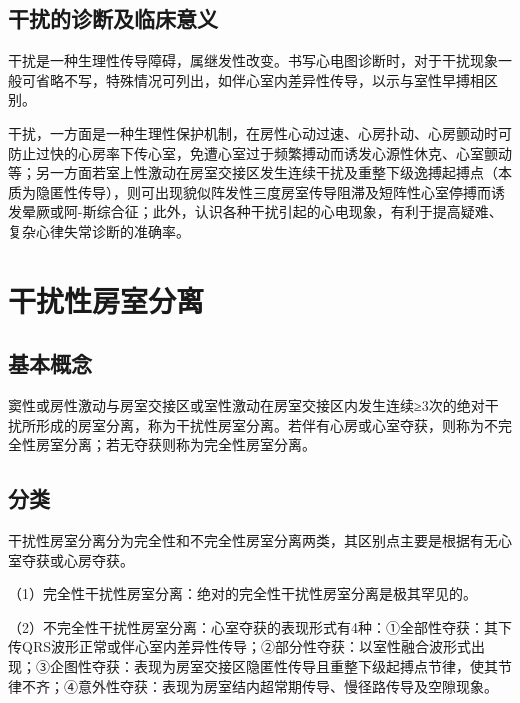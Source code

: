 \protect\hypertarget{text00033.htmlux5cux23subid400}{}{}

\subsection{干扰的诊断及临床意义}

干扰是一种生理性传导障碍，属继发性改变。书写心电图诊断时，对于干扰现象一般可省略不写，特殊情况可列出，如伴心室内差异性传导，以示与室性早搏相区别。

干扰，一方面是一种生理性保护机制，在房性心动过速、心房扑动、心房颤动时可防止过快的心房率下传心室，免遭心室过于频繁搏动而诱发心源性休克、心室颤动等；另一方面若室上性激动在房室交接区发生连续干扰及重整下级逸搏起搏点（本质为隐匿性传导），则可出现貌似阵发性三度房室传导阻滞及短阵性心室停搏而诱发晕厥或阿-斯综合征；此外，认识各种干扰引起的心电现象，有利于提高疑难、复杂心律失常诊断的准确率。

\protect\hypertarget{text00033.htmlux5cux23subid401}{}{}

\section{干扰性房室分离}

\protect\hypertarget{text00033.htmlux5cux23subid402}{}{}

\subsection{基本概念}

窦性或房性激动与房室交接区或室性激动在房室交接区内发生连续≥3次的绝对干扰所形成的房室分离，称为干扰性房室分离。若伴有心房或心室夺获，则称为不完全性房室分离；若无夺获则称为完全性房室分离。

\protect\hypertarget{text00033.htmlux5cux23subid403}{}{}

\subsection{分类}

干扰性房室分离分为完全性和不完全性房室分离两类，其区别点主要是根据有无心室夺获或心房夺获。

（1）完全性干扰性房室分离：绝对的完全性干扰性房室分离是极其罕见的。

（2）不完全性干扰性房室分离：心室夺获的表现形式有4种：①全部性夺获：其下传QRS波形正常或伴心室内差异性传导；②部分性夺获：以室性融合波形式出现；③企图性夺获：表现为房室交接区隐匿性传导且重整下级起搏点节律，使其节律不齐；④意外性夺获：表现为房室结内超常期传导、慢径路传导及空隙现象。

